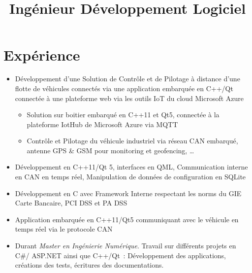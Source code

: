 \documentclass[11pt, a4paper]{moderncv}
\title{Ingénieur Développement Logiciel}
\begin{document}
\makecvtitle

\section{Expérience}
\begin{itemize}
  \item Développement d'une Solution de Contrôle et de Pilotage à distance d'une flotte de véhicules connectés via une application embarquée en C++/Qt connectée à une plateforme web via les outils IoT du cloud Microsoft Azure
  \begin{itemize}
    \item Solution sur boitier embarqué en C++11 et Qt5, connectée à la plateforme IotHub de Microsoft Azure via MQTT
    \item Contrôle et Pilotage du véhicule industriel via réseau CAN embarqué, antenne GPS \& GSM pour monitoring et geofencing, \dots
  \end{itemize}
\end{itemize}
\medskip
{}
\begin{itemize}
  \item Développement en C++11/Qt 5, interfaces en QML, Communication interne en CAN en temps réel, Manipulation de données de configuration en SQLite
\end{itemize}
\medskip
{}
\begin{itemize}
  \item Développement en C avec Framework Interne respectant les norms du GIE Carte Bancaire, PCI DSS et PA DSS
\end{itemize}
\medskip
{}
\begin{itemize}
  \item Application embarquée en C++11/Qt5 communiquant avec le véhicule en temps réel via le protocole CAN 
\end{itemize}
\medskip
{}
\begin{itemize}
  \item Durant \textit{Master en Ingénierie Numérique}. Travail sur différents projets en C\#/ ASP.NET ainsi que C++/Qt : Développement des applications, créations des tests, écritures des documentations.
\end{itemize}
\end{document}
